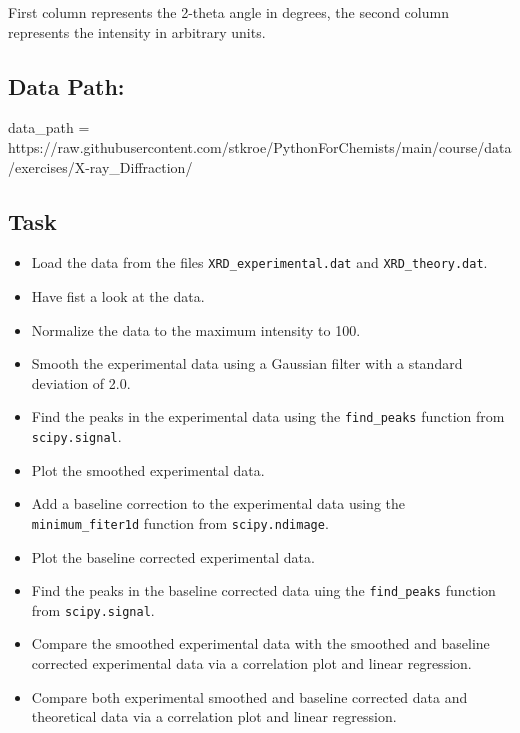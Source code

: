 \documentclass[
  letterpaper,
  DIV=11,
  numbers=noendperiod]{scrreprt}
\newenvironment{Shaded}{\begin{snugshade}}{\end{snugshade}}
\newcommand{\NormalTok}[1]{\textcolor[rgb]{0.00,0.23,0.31}{#1}}
\newcommand{\OperatorTok}[1]{\textcolor[rgb]{0.37,0.37,0.37}{#1}}
\newcommand{\StringTok}[1]{\textcolor[rgb]{0.13,0.47,0.30}{#1}}
\providecommand{\tightlist}{%
  \setlength{\itemsep}{0pt}\setlength{\parskip}{0pt}}\usepackage{longtable,booktabs,array}
\begin{document}
First column represents the 2-theta angle in degrees, the second column
represents the intensity in arbitrary units.

\subsection{Data Path:}\label{data-path-5}

\begin{Shaded}
\begin{Highlighting}[]
\NormalTok{data\_path }\OperatorTok{=} \StringTok{\textquotesingle{}https://raw.githubusercontent.com/stkroe/PythonForChemists/main/course/data/exercises/X{-}ray\_Diffraction/\textquotesingle{}}
\end{Highlighting}
\end{Shaded}

\subsection{Task}\label{task-6}

\begin{itemize}
\tightlist
\item
  Load the data from the files \texttt{XRD\_experimental.dat} and
  \texttt{XRD\_theory.dat}.
\item
  Have fist a look at the data.
\item
  Normalize the data to the maximum intensity to 100.
\item
  Smooth the experimental data using a Gaussian filter with a standard
  deviation of 2.0.
\item
  Find the peaks in the experimental data using the \texttt{find\_peaks}
  function from \texttt{scipy.signal}.
\item
  Plot the smoothed experimental data.
\item
  Add a baseline correction to the experimental data using the
  \texttt{minimum\_fiter1d} function from \texttt{scipy.ndimage}.
\item
  Plot the baseline corrected experimental data.
\item
  Find the peaks in the baseline corrected data uing the
  \texttt{find\_peaks} function from \texttt{scipy.signal}.
\item
  Compare the smoothed experimental data with the smoothed and baseline
  corrected experimental data via a correlation plot and linear
  regression.
\item
  Compare both experimental smoothed and baseline corrected data and
  theoretical data via a correlation plot and linear regression.
\end{itemize}
\end{document}

